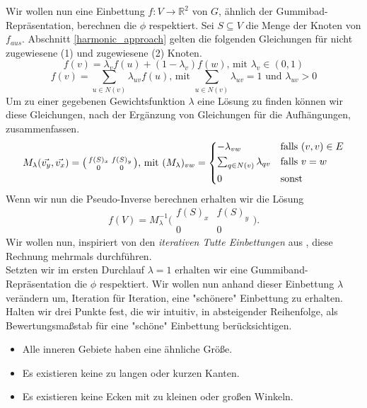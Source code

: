 Wir wollen nun eine Einbettung $f:V\to \mathbb{R}^2$ von $G$, ähnlich der Gummibad-Repräsentation, berechnen die $\phi$ respektiert. Sei $S \subseteq V$ die Menge der Knoten von $f_{aus}$. Abschnitt \ref{harmonic_approach} gelten die folgenden Gleichungen für nicht zugewiesene (1) und zugewiesene (2) Knoten.
$$ f(v) = \lambda_v f(u) + (1-\lambda_v)f(w) \text{, mit } \lambda_v \in (0,1) $$
$$ f(v) = \sum_{u \in N(v)} \lambda_{uv} f(u) \text{, mit }  \sum_{u \in N(v)}\lambda_{uv} = 1 \text{ und } \lambda_{uv} > 0 $$
Um zu einer gegebenen Gewichtsfunktion $\lambda$ eine Lösung zu finden können wir diese Gleichungen, nach der Ergänzung von Gleichungen für die Aufhängungen, zusammenfassen.
\[ M_{\lambda}(\vec{v_y},\vec{v_x}) = \big( \begin{smallmatrix}f(S)_x&f(S)_y\\ 0&0\end{smallmatrix} \big) \text{, mit } (M_{\lambda})_{vw} =
	\begin{dcases}
	-\lambda_{vw} & \text{falls } (v,v) \in E \\
	\textstyle\sum_{q \in N(v)} \lambda_{qv} & \text{falls } v = w \\
	0 & \text{sonst} \\
	\end{dcases}
\]
Wenn wir nun die Pseudo-Inverse berechnen erhalten wir die Lösung
$$f(V) = M_{\lambda}^{-1}\big( \begin{smallmatrix}f(S)_x&f(S)_y\\ 0&0\end{smallmatrix} \big).$$
Wir wollen nun, inspiriert von den \textit{iterativen Tutte Einbettungen} aus \cite{fs17}, diese Rechnung mehrmals durchführen.\\

Setzten wir im ersten Durchlauf $\lambda = 1$ erhalten wir eine Gummiband-Repräsentation die $\phi$ respektiert. Wir wollen nun anhand dieser Einbettung $\lambda$ verändern um, Iteration für Iteration, eine "schönere" Einbettung zu erhalten. Halten wir drei Punkte fest, die wir intuitiv, in absteigender Reihenfolge, als Bewertungsmaßstab für eine "schöne" Einbettung berücksichtigen.
\begin{itemize}
\item Alle inneren Gebiete haben eine ähnliche Größe.
\item Es existieren keine zu langen oder kurzen Kanten.
\item Es existieren keine Ecken mit zu kleinen oder großen Winkeln.
\end{itemize}

